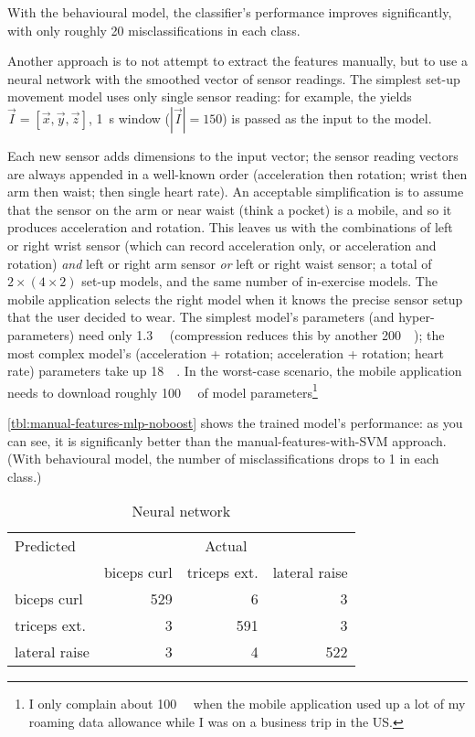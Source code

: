 With the behavioural model, the classifier's performance improves significantly, with only roughly 20 misclassifications in each class. 

Another approach is to not attempt to extract the features manually, but to use a neural network with the smoothed vector of sensor readings. The simplest set-up movement model uses only single sensor reading: for example, the  yields $\vec{I} = [\vec{x}, \vec{y}, \vec{z}]$, \SI{1}{\second} window ($|\vec{I}| = 150$) is passed as the input to the model.

Each new sensor adds dimensions to the input vector; the sensor reading vectors are always appended in a well-known order (acceleration then rotation; wrist then arm then waist; then single heart rate). An acceptable simplification is to assume that the sensor on the arm or near waist (think a pocket) is a mobile, and so it produces acceleration and rotation. This leaves us with the combinations of left or right wrist sensor (which can record acceleration only, or acceleration and rotation) \emph{and} left or right arm sensor \emph{or} left or right waist sensor; a total of $2\times(4\times2)$ set-up models, and the same number of in-exercise models. The mobile application selects the right model when it knows the precise sensor setup that the user decided to wear. The simplest model's parameters (and hyper-parameters) need only \SI{1.3}{\mebi\byte} (compression reduces this by another \SI{200}{\kibi\byte}); the most complex model's (acceleration + rotation; acceleration + rotation; heart rate) parameters take up \SI{18}{\mebi\byte}. In the worst-case scenario, the mobile application needs to download roughly \SI{100}{\mebi\byte} of model parameters\footnote{I only complain about \SI{100}{\mebi\byte} when the mobile application used up a lot of my roaming data allowance while I was on a business trip in the US.}

\autoref{tbl:manual-features-mlp-noboost} shows the trained model's performance: as you can see, it is significanly better than the manual-features-with-SVM approach. (With behavioural model, the number of misclassifications drops to 1 in each class.)

\begin{table}[h]
    \begin{tabular}{lrrr}
        \toprule
        Predicted         & \multicolumn{3}{c}{Actual} \\
        \cmidrule(r){2-4} & biceps curl & triceps ext. & lateral raise \\
        \midrule
        biceps curl       & 529         & 6            & 3 \\ 
        triceps ext.      & 3           & 591          & 3 \\
        lateral raise     & 3           & 4            & 522 \\
        \bottomrule
    \end{tabular}
    \caption{Neural network}
    \label{tbl:manual-features-mlp-noboost}
\end{table}

